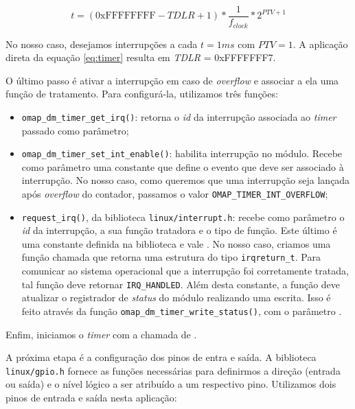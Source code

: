 \begin{equation} 
t = (\text{0xFFFFFFFF} - TDLR + 1)*\frac{1}{f_{clock}}*2^{PTV+1}
\label{eq:timer}
\end{equation}

No nosso caso, desejamos interrupções a cada \(t=1ms\) com \(PTV=1\). A
aplicação direta da equação \ref{eq:timer} resulta em \textit{TDLR} =
0xFFFFFFF7.

\vspace{12pt}

O último passo é ativar a interrupção em caso de \textit{overflow} e associar a
ela uma função de tratamento. Para configurá-la, utilizamos três funções:

\begin{itemize} \renewcommand\labelitemi{--}
  \item \texttt{omap\_dm\_timer\_get\_irq()}: retorna o \textit{id} da
  interrupção associada ao \textit{timer} passado como parâmetro;

  \item \texttt{omap\_dm\_timer\_set\_int\_enable()}: habilita interrupção no
  módulo. Recebe como parâmetro uma constante que define o evento que deve ser
  associado à interrupção. No nosso caso, como queremos que uma interrupção seja
  lançada após \textit{overflow} do contador, passamos o valor
  \texttt{OMAP\_TIMER\_INT\_OVERFLOW};

  \item \texttt{request\_irq()}, da biblioteca \texttt{linux/interrupt.h}:
  recebe como parâmetro o \textit{id} da interrupção, a sua função tratadora e
  o tipo de função. Este último é uma constante definida na biblioteca e vale
  . No nosso caso, criamos uma função chamada
   que retorna uma estrutura do tipo \texttt{irqreturn\_t}. Para comunicar ao sistema
  operacional que a interrupção foi corretamente tratada, tal função deve
  retornar \texttt{IRQ\_HANDLED}. Além desta constante, a função deve atualizar
  o registrador de \textit{status} do módulo realizando uma escrita. Isso é
  feito através da função \texttt{omap\_dm\_timer\_write\_status()}, com o
  parâmetro .
\end{itemize}
 
Enfim, iniciamos o \textit{timer} com a chamada de .

\vspace{12pt}

A próxima etapa é a configuração dos pinos de entra e saída. A biblioteca
\texttt{linux/gpio.h} fornece as funções necessárias para definirmos a direção
(entrada ou saída) e o nível lógico a ser atribuído a um respectivo pino.
Utilizamos dois pinos de entrada e saída nesta aplicação:


